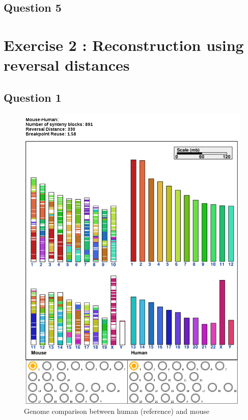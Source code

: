 \documentclass[]{article}
\begin{document}
\subsection{Question 5}



\section{Exercise 2 : Reconstruction using reversal distances}
\subsection{Question 1}

\begin{figure}[h]
	\includegraphics*[width = \linewidth]{../human_mouse.png}
	\caption{\label{h_m} Genome comparison between human (reference) and mouse }
\end{figure}
\end{document}
